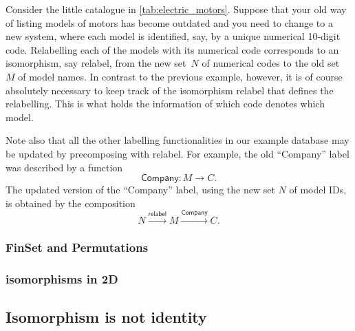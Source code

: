 \begin{example}[Relabelling]
Consider the little catalogue in \cref{tab:electric_motors}. Suppose that your old way of listing models of motors has become outdated and you need to change to a new system, where each model is identified, say, by a unique numerical 10-digit code. Relabelling each of the models with its numerical code corresponds to an isomorphism, say \textsf{relabel}, from the new set~$N$ of numerical codes to the old set~$M$ of model names. In contrast to the previous example, however, it is of course absolutely necessary to keep track of the isomorphism \textsf{relabel} that defines the relabelling. This is what holds the information of which code denotes which model.

Note also that all the other labelling functionalities in our example database may be updated by precomposing with \textsf{relabel}. For example, the old ``Company'' label was described by a function
\begin{equation*}
\textsf{Company}\colon M \to C.
\end{equation*}
The updated version of the ``Company'' label, using the new set $N$ of model IDs, is obtained by the composition
\begin{equation*}
N \overset{\textsf{relabel}}{\longrightarrow} M \overset{\textsf{Company}}{\longrightarrow} C.
\end{equation*}
\end{example}


\subsubsection{FinSet and Permutations}



\subsubsection{isomorphisms in 2D}


\subsection{Isomorphism is not identity}







  
